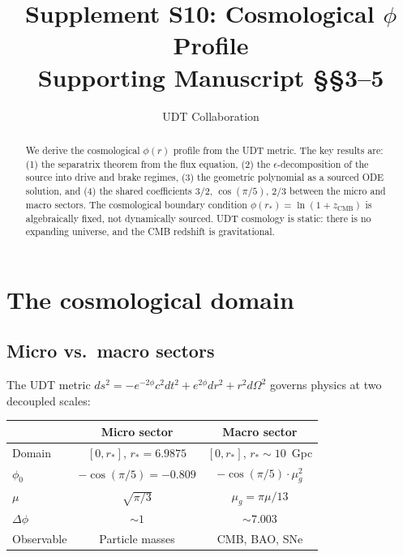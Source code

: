 \documentclass[11pt,letterpaper]{article}
\title{Supplement S10: Cosmological $\phi$ Profile \\
\large Supporting Manuscript \S\S3--5}
\author{UDT Collaboration}
\date{}
\numberwithin{equation}{section}
\begin{document}
\maketitle

\begin{abstract}
We derive the cosmological $\phi(r)$ profile from the UDT metric. The
key results are: (1) the separatrix theorem from the flux equation,
(2) the $\epsilon$-decomposition of the source into drive and brake
regimes, (3) the geometric polynomial as a sourced ODE solution, and
(4) the shared coefficients $3/2$, $\cos(\pi/5)$, $2/3$ between the
micro and macro sectors. The cosmological boundary condition
$\phi(r_*) = \ln(1 + z_\mathrm{CMB})$ is algebraically fixed, not
dynamically sourced. UDT cosmology is static: there is no expanding
universe, and the CMB redshift is gravitational.
\end{abstract}

\tableofcontents

\section{The cosmological domain}
\label{sec:domain}

\subsection{Micro vs.\ macro sectors}

The UDT metric $ds^2 = -e^{-2\phi}c^2 dt^2 + e^{2\phi}dr^2 + r^2 d\Omega^2$
governs physics at two decoupled scales:

\begin{center}
\begin{tabular}{lcc}
\toprule
 & Micro sector & Macro sector \\
\midrule
Domain & $[0, r_*]$, $r_* = 6.9875$ & $[0, r_*]$, $r_* \sim 10$~Gpc \\
$\phi_0$ & $-\cos(\pi/5) = -0.809$ & $-\cos(\pi/5) \cdot \mu_g^2$ \\
$\mu$ & $\sqrt{\pi/3}$ & $\mu_g = \pi\mu/13$ \\
$\Delta\phi$ & $\sim 1$ & $\sim 7.003$ \\
Observable & Particle masses & CMB, BAO, SNe \\
\bottomrule
\end{tabular}
\end{center}
\end{document}
